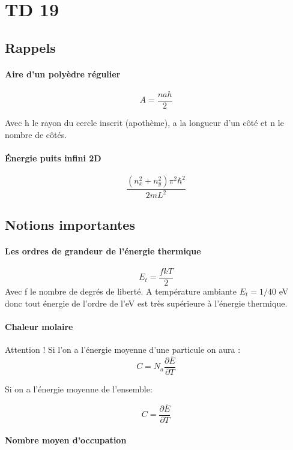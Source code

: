 \section{TD 19}



\subsection{Rappels}


\paragraph{Aire d'un polyèdre régulier}

\[
	A=\frac{nah}{2}
\]

Avec h le rayon du cercle inscrit  (apothème), a la longueur d'un côté et n le nombre de côtés.


\paragraph{Énergie puits infini 2D }

\[
	\frac{(n_x^2+n_y^2 )\pi^2\hbar^2}{2mL^2}
\]


\subsection{Notions importantes}


\paragraph{Les ordres de grandeur de l'énergie thermique}

\[
	E_t=\frac{fkT}{2}
\] Avec f le nombre de degrés de liberté. A température ambiante $E_t=1/40$ eV donc tout énergie de l'ordre de l'eV est très supérieure à l'énergie thermique.


\paragraph{Chaleur molaire}

Attention ! Si l'on a l'énergie moyenne d'une particule on aura :
\[
	 C=N_a \frac{\partial \bar{E}}{\partial T}
\]

Si on a l'énergie moyenne de l'ensemble:

\[
	 C= \frac{\partial \bar{E}}{\partial T}
\]

\paragraph{Nombre moyen d'occupation}

